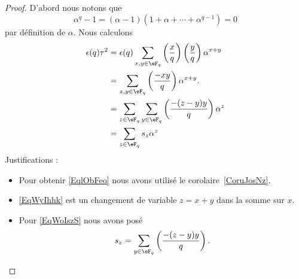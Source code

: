 \begin{proof}
    D'abord nous notons que
    \begin{equation}
        \alpha^q-1=(\alpha-1)(1+\alpha+\cdots+\alpha^{q-1})=0
    \end{equation}
    par définition de \( \alpha\). Nous calculons
    \begin{subequations}
        \begin{align}
            \epsilon(q)\tau^2&=\epsilon(q)\sum_{x,y\in \eF_q}\left(\frac{x}{q}\right)\left(\frac{y}{q}\right)\alpha^{x+y}\\
            &=\sum_{x,y\in \eF_q}\left(\frac{-xy}{q}\right)\alpha^{x+y}. \label{EqlObFeo}\\
            &=\sum_{z\in \eF_q}\sum_{y\in \eF_q}\left(\frac{-(z-y)y}{q}\right)\alpha^{z}    \label{EqWyIhhk}\\
            &=\sum_{z\in \eF_q}s_z\alpha^z  \label{EqWoIszS}
        \end{align}
    \end{subequations}
    Justifications :
    \begin{itemize}
        \item
            Pour obtenir \eqref{EqlObFeo} nous avons utilisé le corolaire~\ref{CoruJosNz}.
        \item
            \eqref{EqWyIhhk} est un changement de variable \( z=x+y\) dans la somme sur \( x\).
        \item
            Pour \eqref{EqWoIszS} nous avons posé
            \begin{equation}
                s_z=\sum_{y\in \eF_q}\left(\frac{-(z-y)y}{q}\right).
            \end{equation}


\end{itemize}
\end{proof}

